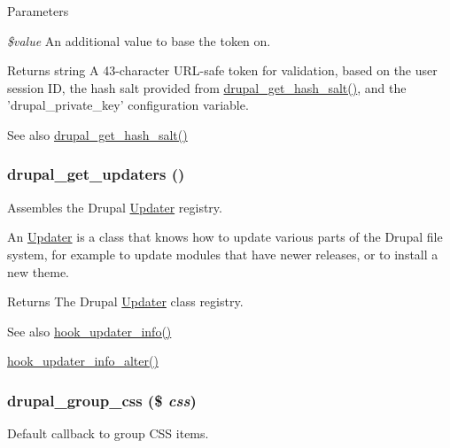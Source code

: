 \begin{DoxyParams}{Parameters}
\item[{\em \$value}]An additional value to base the token on.\end{DoxyParams}
\begin{DoxyReturn}{Returns}
string A 43-\/character URL-\/safe token for validation, based on the user session ID, the hash salt provided from \hyperlink{bootstrap_8inc_a832314334940cc1578689241d665d7e8}{drupal\_\-get\_\-hash\_\-salt()}, and the 'drupal\_\-private\_\-key' configuration variable.
\end{DoxyReturn}
\begin{DoxySeeAlso}{See also}
\hyperlink{bootstrap_8inc_a832314334940cc1578689241d665d7e8}{drupal\_\-get\_\-hash\_\-salt()} 
\end{DoxySeeAlso}
\hypertarget{common_8inc_a0fa53aa7b4cdefaccb5283da37ad75df}{
\subsubsection[{drupal\_\-get\_\-updaters}]{\setlength{\rightskip}{0pt plus 5cm}drupal\_\-get\_\-updaters ()}}
\label{common_8inc_a0fa53aa7b4cdefaccb5283da37ad75df}
Assembles the Drupal \hyperlink{classUpdater}{Updater} registry.

An \hyperlink{classUpdater}{Updater} is a class that knows how to update various parts of the Drupal file system, for example to update modules that have newer releases, or to install a new theme.

\begin{DoxyReturn}{Returns}
The Drupal \hyperlink{classUpdater}{Updater} class registry.
\end{DoxyReturn}
\begin{DoxySeeAlso}{See also}
\hyperlink{group__hooks_gafb9b375716a0ad02d35250dc252b3c99}{hook\_\-updater\_\-info()} 

\hyperlink{group__hooks_gaf697fc432c34c994712849afa70c1b89}{hook\_\-updater\_\-info\_\-alter()} 
\end{DoxySeeAlso}
\hypertarget{common_8inc_a2d63a3ab0ae5c285f4546304a4775ae3}{
\subsubsection[{drupal\_\-group\_\-css}]{\setlength{\rightskip}{0pt plus 5cm}drupal\_\-group\_\-css (\$ {\em css})}}
\label{common_8inc_a2d63a3ab0ae5c285f4546304a4775ae3}
Default callback to group CSS items.

